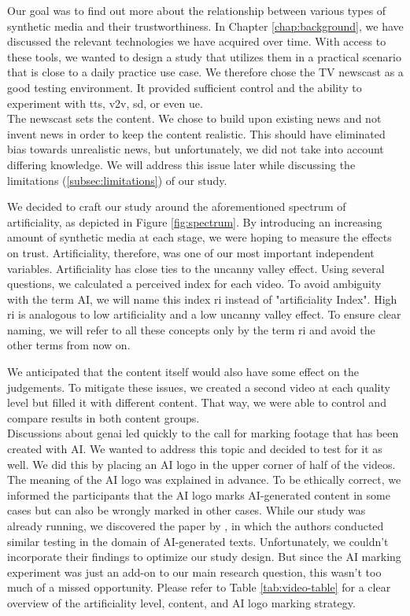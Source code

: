 \documentclass[
  a4paper,  %
  twoside,  %
  bibliography=totoc,
  headsepline,
  cleardoublepage=empty,
  parskip=half,
  draft=false
]{scrbook}
\begin{document}
Our goal was to find out more about the relationship between various types of synthetic media and their trustworthiness. In Chapter \ref{chap:background}, we have discussed the relevant technologies we have acquired over time. With access to these tools, we wanted to design a study that utilizes them in a practical scenario that is close to a daily practice use case. We therefore chose the TV newscast as a good testing environment. It provided sufficient control and the ability to experiment with \gls{tts}, \gls{v2v}, \gls{sd}, or even \gls{ue}. \\
The newscast sets the content. We chose to build upon existing news and not invent news in order to keep the content realistic. This should have eliminated bias towards unrealistic news, but unfortunately, we did not take into account differing knowledge. We will address this issue later while discussing the limitations (\ref{subsec:limitations}) of our study.

We decided to craft our study around the aforementioned spectrum of artificiality, as depicted in Figure \ref{fig:spectrum}. By introducing an increasing amount of synthetic media at each stage, we were hoping to measure the effects on trust. Artificiality, therefore, was one of our most important independent variables. Artificiality has close ties to the uncanny valley effect. Using several questions, we calculated a perceived index for each video. To avoid ambiguity with the term AI, we will name this index \gls{ri} instead of "artificiality Index". High \gls{ri} is analogous to low artificiality and a low uncanny valley effect. To ensure clear naming, we will refer to all these concepts only by the term \gls{ri} and avoid the other terms from now on.

We anticipated that the content itself would also have some effect on the judgements. To mitigate these issues, we created a second video at each quality level but filled it with different content. That way, we were able to control and compare results in both content groups. \\
Discussions about \gls{genai} led quickly to the call for marking footage that has been created with AI. We wanted to address this topic and decided to test for it as well. We did this by placing an AI logo in the upper corner of half of the videos. The meaning of the AI logo was explained in advance. To be ethically correct, we informed the participants that the AI logo marks AI-generated content in some cases but can also be wrongly marked in other cases. While our study was already running, we discovered the paper by \citeauthor{toffTheyCouldJust2023}, in which the authors conducted similar testing in the domain of AI-generated texts. Unfortunately, we couldn't incorporate their findings to optimize our study design. But since the AI marking experiment was just an add-on to our main research question, this wasn't too much of a missed opportunity. Please refer to Table \ref{tab:video-table} for a clear overview of the artificiality level, content, and AI logo marking strategy. 
\end{document}
